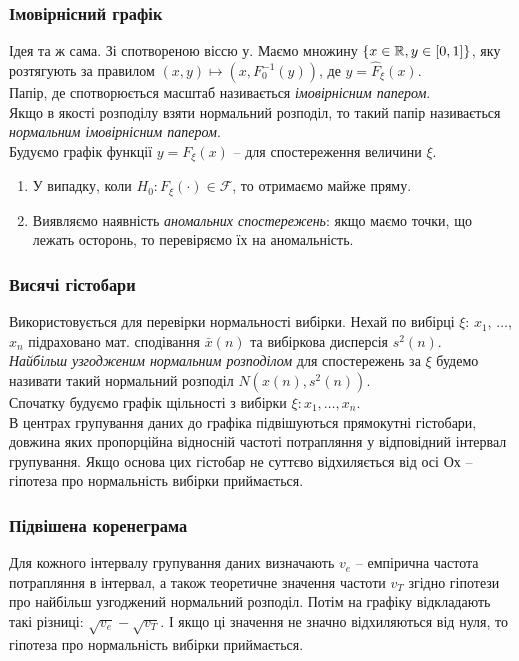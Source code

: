 \subsubsection{Імовірнісний графік}
Ідея та ж сама. Зі спотвореною віссю $у$. Маємо множину $\{x \in \mathbb{R}, y \in [0,1]\}$, яку розтягують за правилом $(x, y) \mapsto \left(x, F_0^{-1}(y)\right)$, де $y = \widehat{F}_\xi (x)$. \\

Папір, де спотворюється масштаб називається \textit{імовірнісним папером}. \\

Якщо в якості розподілу взяти нормальний розподіл, то такий папір називається \textit{нормальним імовірнісним папером}. \\

Будуємо графік функції $y = F_\xi(x)$ -- для спостереження величини $\xi$.
\begin{enumerate}
	\item У випадку, коли $H_0: F_\xi(\cdot)\in \mathcal{F}$, то отримаємо майже пряму.
	\item Виявляємо наявність \textit{аномальних спостережень}: якщо маємо точки, що лежать осторонь, то перевіряємо їх на аномальність.
\end{enumerate}
\subsubsection{Висячі гістобари}
Використовується для перевірки нормальності вибірки. Нехай по вибірці $\xi$: $x_1$, $\ldots$, $x_n$ підраховано мат. сподівання $\bar x(n)$ та вибіркова дисперсія $s^2(n)$. \\

\textit{Найбільш узгодженим нормальним розподілом} для спостережень за $\xi$ будемо називати такий нормальний розподіл $N\left(x(n), s^2(n)\right)$. \\

Спочатку будуємо графік щільності з вибірки $\xi: x_1, \ldots, x_n$. \\

В центрах групування даних до графіка підвішуються прямокутні гістобари, довжина яких пропорційна відносній частоті потрапляння у відповідний інтервал групування. Якщо основа
цих гістобар не суттєво відхиляється від осі $Ох$ -- гіпотеза про нормальність вибірки приймається. %
\subsubsection{Підвішена коренеграма}
Для кожного інтервалу групування даних визначають $v_e$ -- емпірична частота потрапляння в інтервал, а також теоретичне значення частоти $v_T$ згідно гіпотези про найбільш узгоджений нормальний розподіл. Потім на графіку відкладають такі різниці: $\sqrt{v_e}-\sqrt{v_T}$. І якщо ці значення не значно відхиляються від нуля, то гіпотеза про нормальність вибірки приймається. %

